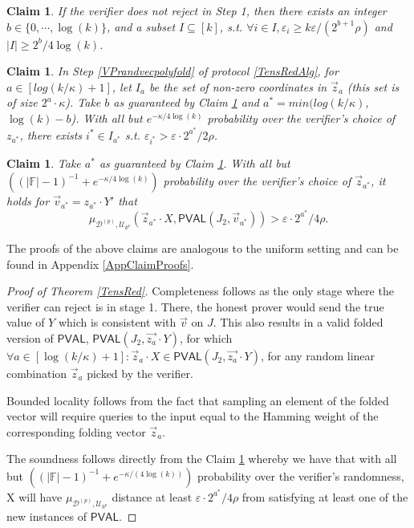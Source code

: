 \documentclass[10pt,a4paper]{article}
\newtheorem{claim}[theorem]{Claim}
\newcommand{\PVAL}{\mathsf{PVAL}}
\newcommand{\F}{\mathbb{F}}
\begin{document}
\begin{claim}\label{sumEps}
If the verifier does not reject in Step 1, then there exists an integer $b \in \{0,\cdots, \log (k)\}$, and a subset $I \subseteq [k]$, s.t. $\forall i \in I, \varepsilon_{i} \geq k\varepsilon/(2^{b+1}\rho)$ and $\vert I\vert  \geq 2^{b}/4\log (k)$.
\end{claim}

\begin{claim}\label{ISize}
In Step \ref{VPrandvecpolyfold} of protocol \ref{TensRedAlg}, for $a \in [log(k/\kappa) + 1]$, let $I_{a}$ be the set of non-zero coordinates in $\vec{z}_{a}$ (this set is of size $2^{a}\cdot \kappa$). Take $b$ as guaranteed by Claim \ref{sumEps} and $a^{\ast} = min(log(k/\kappa)$, $\log (k) - b$). With all but $e^{-\kappa/4 \log (k)}$ probability over the verifier’s choice of $z_{a^{\ast}}$, there exists $i^{\ast} \in I_{a^{\ast}}$ s.t. $\varepsilon_{i^{\ast}} > \varepsilon \cdot 2^{a^{\ast}}/2\rho$.
\end{claim}

\begin{claim}\label{TensRedSound}
Take $a^{\ast}$ as guaranteed by Claim \ref{ISize}. With all but $((\vert \F\vert -1)^{-1}+e^{-\kappa/4 \log (k)} )$ probability over the verifier’s choice of $\vec{z}_{a^{\ast}}$, it holds for $\vec{v}_{a^{\ast}}=z_{a^{\ast}}\cdot Y'$ that 
\begin{equation*}
    \mu_{\mathcal{D}^{(p)},\mathcal{U}_{k^{p}}}(\vec{z}_{a^{\ast}}\cdot X,\PVAL(J_{2},\vec{v}_{a^{\ast}}))> \varepsilon\cdot2^{a^{\ast}}/4\rho.
\end{equation*}
\end{claim}

The proofs of the above claims are analogous to the uniform setting and can be found in Appendix \ref{AppClaimProofs}.

\begin{proof}[Proof of Theorem \ref{TensRed}]
Completeness follows as the only stage where the verifier can reject is in stage 1. There, the honest prover would send the true value of $Y$ which is consistent with $\vec{v}$ on $J$. This also results in a valid folded version of $\PVAL$, $\PVAL(J_{2}, \Vec{z_{a}}\cdot Y)$, for which $\forall a\in [\log(k/\kappa)+1]: \vec{z}_{a}\cdot X\in \PVAL(J_{2}, \Vec{z_{a}}\cdot Y)$, for any random linear combination $\Vec{z}_{a}$ picked by the verifier.   

Bounded locality follows from the fact that sampling an element of the folded vector will require queries to the input equal to the Hamming weight of the corresponding folding vector $\vec{z}_{a}$.    

The soundness follows directly from the Claim \ref{TensRedSound} whereby we have that with all but $((\vert \F\vert -1)^{-1} + e^{-\kappa/(4 \log (k))})$ probability over the verifier's randomness,  X will have $\mu_{\mathcal{D}^{(p)},\mathcal{U}_{k^{p}}}$ distance at least $\varepsilon\cdot2^{a^{\ast}}/4\rho$ from satisfying at least one of the new instances of $\PVAL$.
\end{proof}
\end{document}
